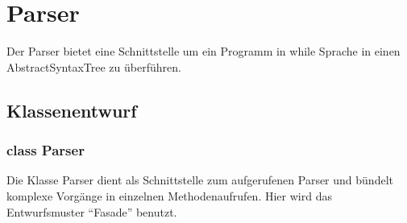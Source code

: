 \section{Parser}

Der Parser bietet eine Schnittstelle um ein Programm in while Sprache in einen AbstractSyntaxTree zu überführen.

\subsection{Klassenentwurf}

\subsubsection{class Parser}

Die Klasse Parser dient als Schnittstelle zum aufgerufenen Parser und bündelt komplexe Vorgänge in einzelnen Methodenaufrufen. Hier wird das Entwurfsmuster "`Fasade"' benutzt.


